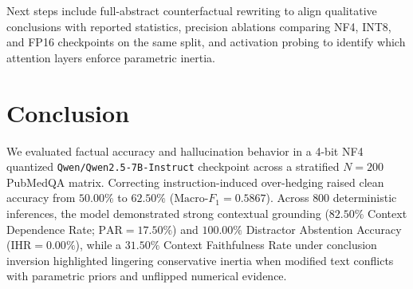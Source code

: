 \documentclass[10pt,twocolumn,letterpaper]{article}
\begin{document}
Next steps include full-abstract counterfactual rewriting to align qualitative conclusions with reported statistics, precision ablations comparing NF4, INT8, and FP16 checkpoints on the same split, and activation probing \cite{panickssery2023steering} to identify which attention layers enforce parametric inertia.

\section{Conclusion}
We evaluated factual accuracy and hallucination behavior in a 4-bit NF4 quantized \texttt{Qwen/Qwen2.5-7B-Instruct} checkpoint across a stratified $N=200$ PubMedQA matrix. Correcting instruction-induced over-hedging raised clean accuracy from $50.00\%$ to $62.50\%$ ($\text{Macro-}F_1 = 0.5867$). Across $800$ deterministic inferences, the model demonstrated strong contextual grounding ($82.50\%$ Context Dependence Rate; $\text{PAR} = 17.50\%$) and $100.00\%$ Distractor Abstention Accuracy ($\text{IHR} = 0.00\%$), while a $31.50\%$ Context Faithfulness Rate under conclusion inversion highlighted lingering conservative inertia when modified text conflicts with parametric priors and unflipped numerical evidence.



\end{document}
